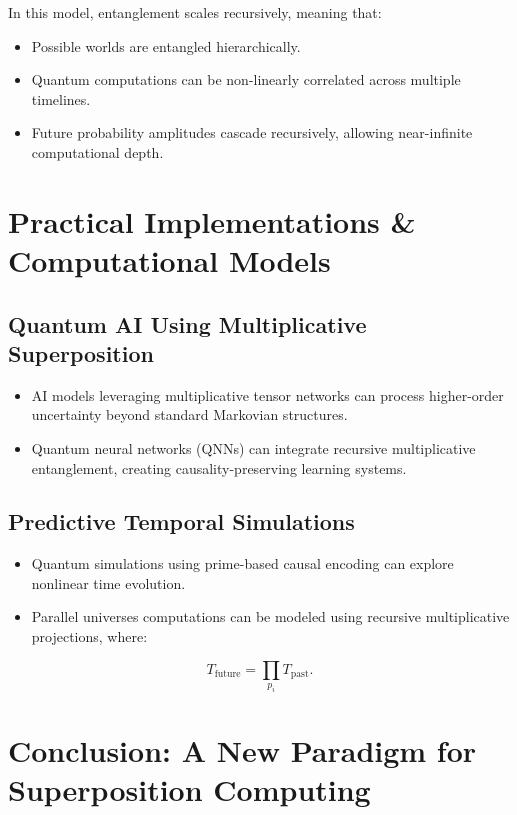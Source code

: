 \documentclass{article}
\theoremstyle{plain}
\begin{document}
In this model, entanglement scales recursively, meaning that:

\begin{itemize}
    \item Possible worlds are entangled hierarchically.
    \item Quantum computations can be non-linearly correlated across multiple timelines.
    \item Future probability amplitudes cascade recursively, allowing near-infinite computational depth.
\end{itemize}

\section{Practical Implementations \& Computational Models}

\subsection{Quantum AI Using Multiplicative Superposition}

\begin{itemize}
    \item AI models leveraging multiplicative tensor networks can process higher-order uncertainty beyond standard Markovian structures.
    \item Quantum neural networks (QNNs) can integrate recursive multiplicative entanglement, creating causality-preserving learning systems.
\end{itemize}

\subsection{Predictive Temporal Simulations}

\begin{itemize}
    \item Quantum simulations using prime-based causal encoding can explore nonlinear time evolution.
    \item Parallel universes computations can be modeled using recursive multiplicative projections, where:
\end{itemize}

\begin{equation}
T_{\text{future}} = \prod_{p_i} T_{\text{past}}.
\end{equation}

\section{Conclusion: A New Paradigm for Superposition Computing}
\end{document}
